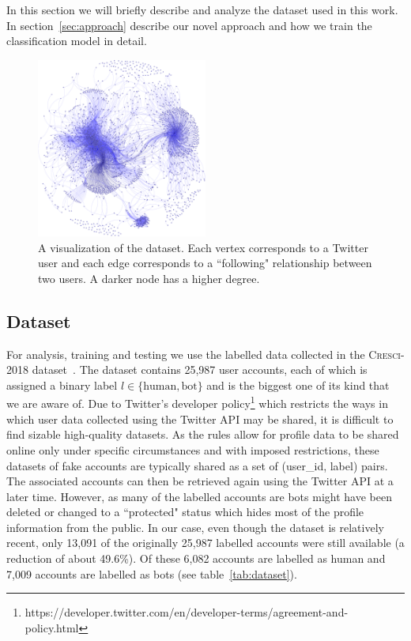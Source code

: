 In this section we will briefly describe and analyze the dataset used in this work. In section~\ref{sec:approach} describe our novel approach and how we train the classification model in detail.

\begin{figure}[t!]
    \centering
    \includegraphics[width=0.5\textwidth]{fig/graph-crop.pdf}
    \caption{A visualization of the dataset. Each vertex corresponds to a Twitter user and each edge corresponds to a ``following" relationship between two users. A darker node has a higher degree.}
    \label{fig:twitter}
\end{figure}

\subsection{Dataset}
For analysis, training and testing we use the labelled data collected in the \textsc{Cresci-2018} dataset~\cite{cresci2018fake}. The dataset contains 25,987 user accounts, each of which is assigned a binary label $l \in \{\text{human},\text{bot}\}$ and is the biggest one of its kind that we are aware of. Due to Twitter's developer policy\footnote{https://developer.twitter.com/en/developer-terms/agreement-and-policy.html} which restricts the ways in which user data collected using the Twitter API may be shared, it is difficult to find sizable high-quality datasets. As the rules allow for profile data to be shared online only under specific circumstances and with imposed restrictions, these datasets of fake accounts are typically shared as a set of (user\_id, label) pairs. The associated accounts can then be retrieved again using the Twitter API at a later time. However, as many of the labelled accounts are bots might have been deleted or changed to a ``protected" status which hides most of the profile information from the public. In our case, even though the dataset is relatively recent, only 13,091 of the originally 25,987 labelled accounts were still available (a reduction of about 49.6\%). Of these 6,082 accounts are labelled as human and 7,009 accounts are labelled as bots (see table~\ref{tab:dataset}).

